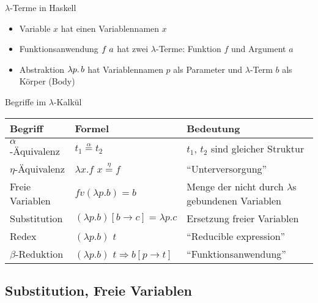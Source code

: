 \documentclass{beamer}
\begin{document}
\begin{frame}{$\lambda$-Terme in Haskell}

    \begin{itemize}
        \item Variable $x$ hat einen Variablennamen $x$
        \item Funktionsanwendung $f\;a$ hat zwei $\lambda$-Terme: Funktion $f$ und Argument $a$
        \item Abstraktion $\lambda p.\, b$ hat Variablennamen $p$ als Parameter und $\lambda$-Term $b$ als Körper (Body)
    \end{itemize}
\end{frame}

\newcommand{\aeq}{\stackrel{\alpha}{=}}
\newcommand{\naeq}{\stackrel{\alpha}{\neq}}
\newcommand{\eeq}{\stackrel{\eta}{=}}


\begin{frame}{Begriffe im $\lambda$-Kalkül}
	\fontsize{9pt}{13}\selectfont

	\begin{tabularx}{\textwidth}{ s | X | X }
		\textbf{Begriff} & \textbf{Formel} & \textbf{Bedeutung} \\
		\hline
		$\alpha$-Äquivalenz & $t_1 \aeq t_2$ & $t_1$, $t_2$ sind gleicher Struktur \\
		\hline
		$\eta$-Äquivalenz & $\lambda{}x.f$ $x \eeq f$ & \enquote{Unterversorgung} \\
		\hline
		Freie Variablen & $fv(\lambda{}p.b) = { b }$ & Menge der nicht durch $\lambda$s gebundenen Variablen \\
		\hline
		Substitution & $(\lambda{}p.b)\left[b\rightarrow{}c\right]=\lambda{}p.c$ & Ersetzung freier Variablen \\
		\hline
		Redex & $(\lambda{}p.b)$ $t$ & \enquote{Reducible expression} \\
		\hline
		$\beta$-Reduktion & $(\lambda{}p.b)$ $t \Rightarrow b\left[p\rightarrow{}t\right]$ & \enquote{Funktionsanwendung} \\
	\end{tabularx}
\end{frame}

\subsection{Substitution, Freie Variablen}
\end{document}
